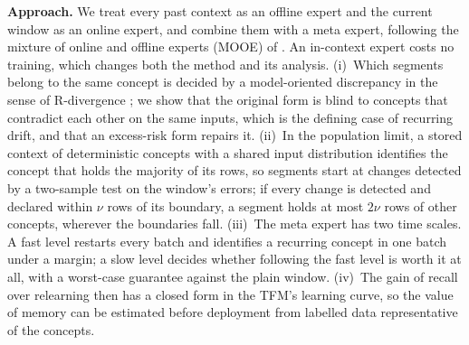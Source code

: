 \documentclass[11pt]{article}
\theoremstyle{plain}
\theoremstyle{definition}
\theoremstyle{remark}
\begin{document}
\textbf{Approach.} We treat every past context as an offline expert and the current window as an online expert, and
combine them with a meta expert, following the mixture of online and offline experts (MOOE) of
\citet{zhao2025mooe}. An in-context expert costs no training, which changes both the method and its analysis.
(i)~Which segments belong to the same concept is decided by a model-oriented discrepancy in the sense of
R-divergence \citep{zhao2023rdiv}; we show that the original form is blind to concepts that contradict each other on
the same inputs, which is the defining case of recurring drift, and that an excess-risk form repairs it.
(ii)~In the population limit, a stored context of deterministic concepts with a shared input distribution
identifies the concept that holds the majority of its rows, so segments start at changes
detected by a two-sample test on the window's errors; if every change is detected and declared within $\nu$ rows of
its boundary, a segment holds at most $2\nu$ rows of other concepts, wherever the boundaries fall.
(iii)~The meta expert has two time scales. A fast level restarts every batch and identifies a recurring concept in
one batch under a margin; a slow level decides whether following the fast level is worth it at all, with a
worst-case guarantee against the plain window. (iv)~The gain of recall over relearning then has a closed form in
the TFM's learning curve, so the value of memory can be estimated before deployment from labelled data
representative of the concepts.
\end{document}

